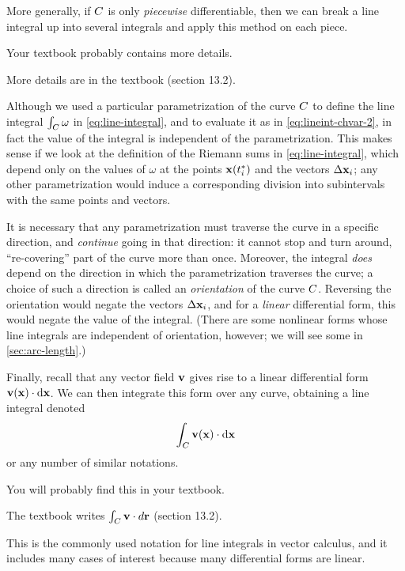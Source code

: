 \documentclass[12pt]{amsart}
\begin{document}
More generally, if $C$ is only \emph{piecewise} differentiable, then we can break a line integral up into several integrals and apply this method on each piece.
\begin{notextbook}Your textbook probably contains more details.\end{notextbook}
\begin{stewart}More details are in the textbook (section 13.2).\end{stewart}

\begin{rmk}\label{rmk:lineint-orientation}
  Although we used a particular parametrization of the curve $C$ to define the line integral $\int_{C} \omega$ in \cref{eq:line-integral}, and to evaluate it as in \cref{eq:lineint-chvar-2}, in fact the value of the integral is independent of the parametrization.
  This makes sense if we look at the definition of the Riemann sums in \cref{eq:line-integral}, which depend only on the values of $\omega$ at the points $\mathbf{x}({t}_{i}^*)$ and the vectors $\Delta \mathbf{x}_i$; any other parametrization would induce a corresponding division into subintervals with the same points and vectors.

  It is necessary that any parametrization must traverse the curve in a specific direction, and \emph{continue} going in that direction: it cannot stop and turn around, ``re-covering'' part of the curve more than once.
  Moreover, the integral \emph{does} depend on the direction in which the parametrization traverses the curve; a choice of such a direction is called an \emph{orientation} of the curve $C$.
  Reversing the orientation would negate the vectors $\Delta \mathbf{x}_i$, and for a \emph{linear} differential form, this would negate the value of the integral.
  (There are some nonlinear forms whose line integrals are independent of orientation, however; we will see some in \cref{sec:arc-length}.)
\end{rmk}

Finally, recall that any vector field $\mathbf{v}$ gives rise to a linear differential form $\mathbf{v}(\mathbf{x}) \cdot {\ensuremath{\mathrm{d} \mathbf{x}}}$.
We can then integrate this form over any curve, obtaining a line integral denoted
\[ \int_{C} \mathbf{v}(\mathbf{x}) \cdot {\ensuremath{\mathrm{d} \mathbf{x}}} \]
or any number of similar notations.
\begin{notextbook}You will probably find this in your textbook.\end{notextbook}%
\begin{stewart}The textbook writes $\int_{C} \mathbf{v} \cdot d\mathbf{r}$ (section 13.2).\end{stewart}
This is the commonly used notation for line integrals in vector calculus, and it includes many cases of interest because many differential forms are linear.
\end{document}

